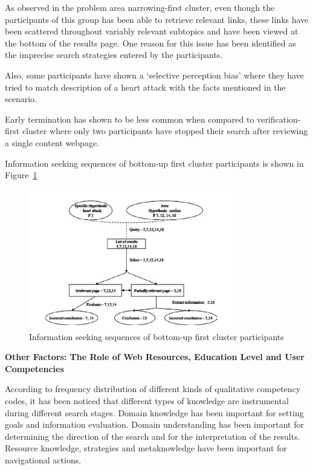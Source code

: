 \documentclass[]{article}
\begin{document}
As observed in the problem area narrowing-first cluster, even though the participants of this group has been able to retrieve relevant links, these links have been scattered throughout variably relevant subtopics and have been viewed at the bottom of the results page. One reason for this issue has been identified as the imprecise search strategies entered by the participants. 

Also, some participants have shown a ‘selective perception bias’ where they have tried to match description of a heart attack with the facts mentioned in the scenario. 

Early termination has shown to be less common when compared to verification-first cluster where only two participants have stopped their search after reviewing a single content webpage.  

Information seeking sequences of bottom-up first cluster participants is shown in Figure~\ref{fig13}

\begin{figure}[t!]
	\includegraphics[width=0.8\textwidth]{Capture13.png}
	\caption{Information seeking sequences of bottom-up first cluster participants\label{fig13}}
\end{figure}

\textbf{Other Factors: The Role of Web Resources, Education Level and User Competencies}

According to frequency distribution of different kinds of qualitative competency codes, it has been noticed that different types of knowledge are instrumental during different search stages. Domain knowledge has been important for setting goals and information evaluation. Domain understanding has been important for determining the direction of the search and for the interpretation of the results. Resource knowledge, strategies and metaknowledge have been important for navigational actions. 
\end{document}
